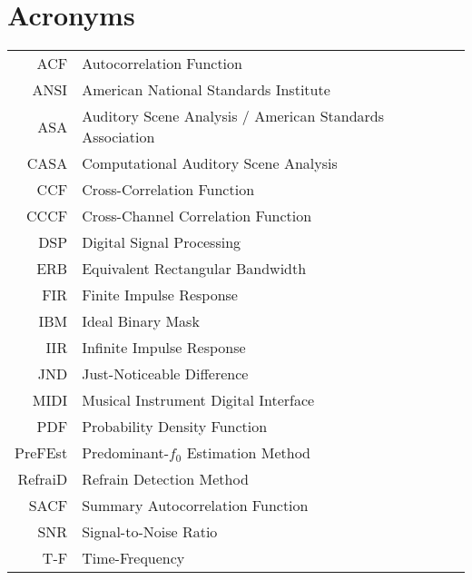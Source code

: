 \documentclass[english,bachelor,unicode]{ctufit-thesis}
\theoremstyle{plain}
\theoremstyle{definition}
\theoremstyle{remark}
\numberwithin{theorem}{chapter}
\begin{document}
	\chapter{Acronyms} %
	\begin{tabular}{rl}
		ACF & Autocorrelation Function\\
		ANSI & American National Standards Institute\\
		ASA & Auditory Scene Analysis / American Standards Association\\
		CASA & Computational Auditory Scene Analysis\\
		CCF & Cross-Correlation Function\\
		CCCF & Cross-Channel Correlation Function\\
		DSP & Digital Signal Processing\\
		ERB & Equivalent Rectangular Bandwidth\\
		FIR & Finite Impulse Response\\
		IBM & Ideal Binary Mask\\
		IIR & Infinite Impulse Response\\
		JND & Just-Noticeable Difference\\
		MIDI & Musical Instrument Digital Interface\\
		PDF & Probability Density Function \\
		PreFEst & Predominant-$f_0$ Estimation Method\\
		RefraiD & Refrain Detection Method\\
		SACF & Summary Autocorrelation Function\\
		SNR & Signal-to-Noise Ratio\\
		T-F & Time-Frequency
	\end{tabular}
	
	\mainmatter\mainmatterinit

	
	
	
	
	
	
	
	\appendix\appendixinit
	
	
	\backmatter
	\printbibliography
\end{document}
